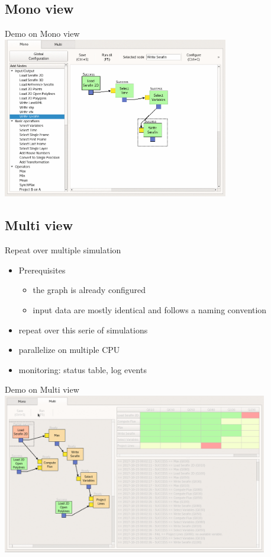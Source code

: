 \subsection{Mono view}

\begin{frame}{Demo on Mono view}
  \centering
  \includegraphics[height=7cm]{animation/mono_demo-430}
\end{frame}


\subsection{Multi view}

\begin{frame}{Repeat over multiple simulation}
  \begin{itemize}
    \item Prerequisites
    \begin{itemize}
      \item the graph is already configured
      \item input data are mostly identical and follows a naming convention
    \end{itemize}
    \item repeat over this serie of simulations
    \item parallelize on multiple CPU
    \item monitoring: status table, log events
  \end{itemize}
\end{frame}

\begin{frame}{Demo on Multi view}
  \centering
  \includegraphics[height=7cm]{animation/multi_demo-181}
\end{frame}
